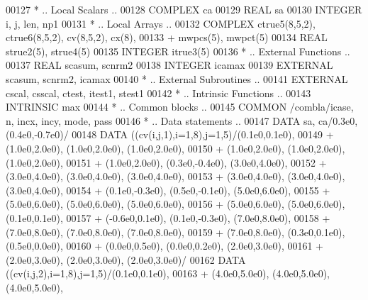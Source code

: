 \begin{DoxyCode}
00127 \textcolor{comment}{*     .. Local Scalars ..}
00128       \textcolor{keywordtype}{COMPLEX}           ca
00129       \textcolor{keywordtype}{REAL}              sa
00130       \textcolor{keywordtype}{INTEGER}           i, j, len, np1
00131 \textcolor{comment}{*     .. Local Arrays ..}
00132       \textcolor{keywordtype}{COMPLEX}           ctrue5(8,5,2), ctrue6(8,5,2), cv(8,5,2), cx(8),
00133      +                  mwpcs(5), mwpct(5)
00134       \textcolor{keywordtype}{REAL}              strue2(5), strue4(5)
00135       \textcolor{keywordtype}{INTEGER}           itrue3(5)
00136 \textcolor{comment}{*     .. External Functions ..}
00137       \textcolor{keywordtype}{REAL}              scasum, scnrm2
00138       \textcolor{keywordtype}{INTEGER}           icamax
00139       \textcolor{keywordtype}{EXTERNAL}          scasum, scnrm2, icamax
00140 \textcolor{comment}{*     .. External Subroutines ..}
00141       \textcolor{keywordtype}{EXTERNAL}          cscal, csscal, ctest, itest1, stest1
00142 \textcolor{comment}{*     .. Intrinsic Functions ..}
00143       \textcolor{keywordtype}{INTRINSIC}         max
00144 \textcolor{comment}{*     .. Common blocks ..}
00145       \textcolor{keyword}{COMMON}            /combla/icase, n, incx, incy, mode, pass
00146 \textcolor{comment}{*     .. Data statements ..}
00147       \textcolor{keyword}{DATA}              sa, ca/0.3e0, (0.4e0,-0.7e0)/
00148       \textcolor{keyword}{DATA}              ((cv(i,j,1),i=1,8),j=1,5)/(0.1e0,0.1e0),
00149      +                  (1.0e0,2.0e0), (1.0e0,2.0e0), (1.0e0,2.0e0),
00150      +                  (1.0e0,2.0e0), (1.0e0,2.0e0), (1.0e0,2.0e0),
00151      +                  (1.0e0,2.0e0), (0.3e0,-0.4e0), (3.0e0,4.0e0),
00152      +                  (3.0e0,4.0e0), (3.0e0,4.0e0), (3.0e0,4.0e0),
00153      +                  (3.0e0,4.0e0), (3.0e0,4.0e0), (3.0e0,4.0e0),
00154      +                  (0.1e0,-0.3e0), (0.5e0,-0.1e0), (5.0e0,6.0e0),
00155      +                  (5.0e0,6.0e0), (5.0e0,6.0e0), (5.0e0,6.0e0),
00156      +                  (5.0e0,6.0e0), (5.0e0,6.0e0), (0.1e0,0.1e0),
00157      +                  (-0.6e0,0.1e0), (0.1e0,-0.3e0), (7.0e0,8.0e0),
00158      +                  (7.0e0,8.0e0), (7.0e0,8.0e0), (7.0e0,8.0e0),
00159      +                  (7.0e0,8.0e0), (0.3e0,0.1e0), (0.5e0,0.0e0),
00160      +                  (0.0e0,0.5e0), (0.0e0,0.2e0), (2.0e0,3.0e0),
00161      +                  (2.0e0,3.0e0), (2.0e0,3.0e0), (2.0e0,3.0e0)/
00162       \textcolor{keyword}{DATA}              ((cv(i,j,2),i=1,8),j=1,5)/(0.1e0,0.1e0),
00163      +                  (4.0e0,5.0e0), (4.0e0,5.0e0), (4.0e0,5.0e0),

\end{DoxyCode}
